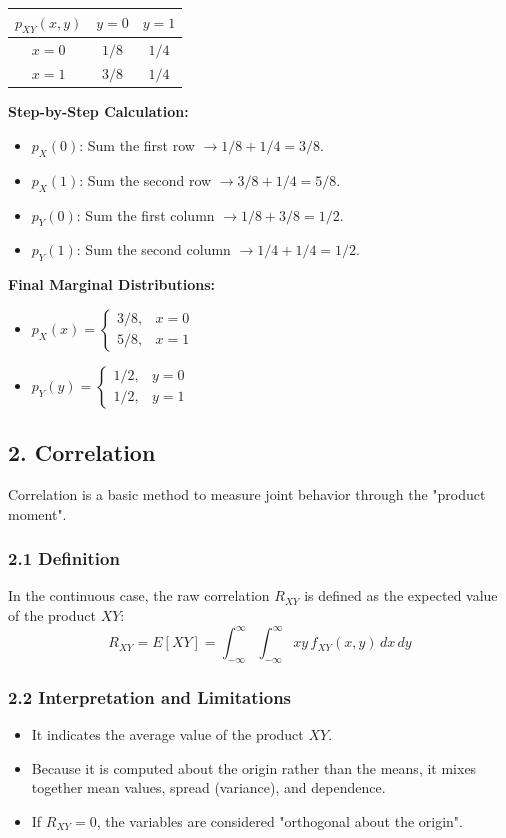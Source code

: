 \documentclass{article}
\begin{document}
\begin{center}
\begin{tabular}{|c|c|c|}
\hline
$p_{XY}(x,y)$ & $y=0$ & $y=1$ \\ \hline
$x=0$ & $1/8$ & $1/4$ \\ \hline
$x=1$ & $3/8$ & $1/4$ \\ \hline
\end{tabular}
\end{center}

\textbf{Step-by-Step Calculation:}
\begin{itemize}
    \item $p_X(0)$: Sum the first row $\rightarrow 1/8 + 1/4 = 3/8$.
    \item $p_X(1)$: Sum the second row $\rightarrow 3/8 + 1/4 = 5/8$.
    \item $p_Y(0)$: Sum the first column $\rightarrow 1/8 + 3/8 = 1/2$.
    \item $p_Y(1)$: Sum the second column $\rightarrow 1/4 + 1/4 = 1/2$.
\end{itemize}

\textbf{Final Marginal Distributions:}
\begin{itemize}
    \item $p_{X}(x) = \begin{cases} 3/8, & x=0 \\ 5/8, & x=1 \end{cases}$
    \item $p_{Y}(y) = \begin{cases} 1/2, & y=0 \\ 1/2, & y=1 \end{cases}$
\end{itemize}

\subsection*{2. Correlation}
Correlation is a basic method to measure joint behavior through the "product moment".

\subsubsection*{2.1 Definition}
In the continuous case, the raw correlation $R_{XY}$ is defined as the expected value of the product $XY$:
$$R_{XY} = E[XY] = \int_{-\infty}^{\infty} \int_{-\infty}^{\infty} xy \, f_{XY}(x,y) \, dx \, dy$$

\subsubsection*{2.2 Interpretation and Limitations}
\begin{itemize}
    \item It indicates the average value of the product $XY$.
    \item Because it is computed about the origin rather than the means, it mixes together mean values, spread (variance), and dependence.
    \item If $R_{XY} = 0$, the variables are considered "orthogonal about the origin".
\end{itemize}
\end{document}
